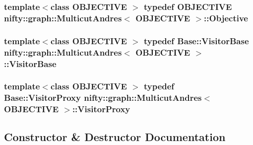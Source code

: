 \subsubsection[{Objective}]{\setlength{\rightskip}{0pt plus 5cm}template$<$class O\+B\+J\+E\+C\+T\+I\+V\+E $>$ typedef O\+B\+J\+E\+C\+T\+I\+V\+E {\bf nifty\+::graph\+::\+Multicut\+Andres}$<$ O\+B\+J\+E\+C\+T\+I\+V\+E $>$\+::{\bf Objective}}\label{classnifty_1_1graph_1_1MulticutAndres_af65f82c6d6f78356d08de6728618fc02}
\hypertarget{classnifty_1_1graph_1_1MulticutAndres_ac07b28fb84cb2202147dd666d5d19c25}{}
\subsubsection[{Visitor\+Base}]{\setlength{\rightskip}{0pt plus 5cm}template$<$class O\+B\+J\+E\+C\+T\+I\+V\+E $>$ typedef {\bf Base\+::\+Visitor\+Base} {\bf nifty\+::graph\+::\+Multicut\+Andres}$<$ O\+B\+J\+E\+C\+T\+I\+V\+E $>$\+::{\bf Visitor\+Base}}\label{classnifty_1_1graph_1_1MulticutAndres_ac07b28fb84cb2202147dd666d5d19c25}
\hypertarget{classnifty_1_1graph_1_1MulticutAndres_ad56184f36c01591fbb5d99da132c2833}{}
\subsubsection[{Visitor\+Proxy}]{\setlength{\rightskip}{0pt plus 5cm}template$<$class O\+B\+J\+E\+C\+T\+I\+V\+E $>$ typedef {\bf Base\+::\+Visitor\+Proxy} {\bf nifty\+::graph\+::\+Multicut\+Andres}$<$ O\+B\+J\+E\+C\+T\+I\+V\+E $>$\+::{\bf Visitor\+Proxy}}\label{classnifty_1_1graph_1_1MulticutAndres_ad56184f36c01591fbb5d99da132c2833}


\subsection{Constructor \& Destructor Documentation}
\hypertarget{classnifty_1_1graph_1_1MulticutAndres_a73522acdc6759774aa77f6659ed8eb73}{}
